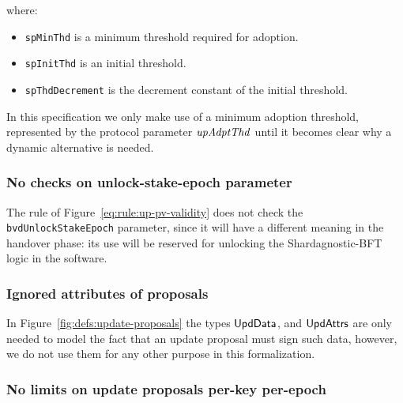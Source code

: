 where:
\begin{itemize}
\item \lstinline{spMinThd} is a minimum threshold required for adoption.
\item \lstinline{spInitThd} is an initial threshold.
\item \lstinline{spThdDecrement} is the decrement constant of the initial
  threshold.
\end{itemize}

In this specification we only make use of a minimum adoption threshold,
represented by the protocol parameter $\mathit{upAdptThd}$ until it becomes clear
why a dynamic alternative is needed.

\subsubsection{No checks on unlock-stake-epoch parameter}
\label{sec:no-unlock-stake-epoch-check}

The rule of Figure~\ref{eq:rule:up-pv-validity} does not check the
\lstinline{bvdUnlockStakeEpoch} parameter, since it will have a different
meaning in the handover phase: its use will be reserved for unlocking the
Shardagnostic-BFT logic in the software.

\subsubsection{Ignored attributes of proposals}

In Figure~\ref{fig:defs:update-proposals} the types
$\mathsf{UpdData}$, and $\mathsf{UpdAttrs}$ are only needed to model the fact that
an update proposal must sign such data, however, we do not use them for any
other purpose in this formalization.

\subsubsection{No limits on update proposals per-key per-epoch}
\label{sec:no-up-limits}

